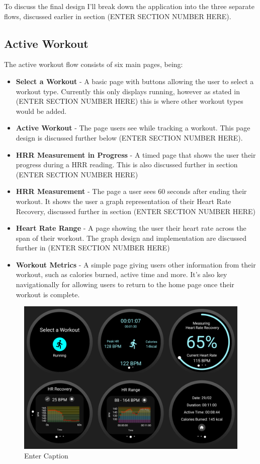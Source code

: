 \documentclass{l4proj}
\begin{document}
To discuss the final design I’ll break down the application into the three separate flows, discussed earlier in section (ENTER SECTION NUMBER HERE). 

\subsection{Active Workout}

The active workout flow consists of six main pages, being:

\begin{itemize}
    \item \textbf{Select a Workout} - A basic page with buttons allowing the user to select a workout type. Currently this only displays running, however as stated in (ENTER SECTION NUMBER HERE) this is where other workout types would be added.
    \item \textbf{Active Workout} - The page users see while tracking a workout. This page design is discussed further below (ENTER SECTION NUMBER HERE).
    \item \textbf{HRR Measurement in Progress} - A timed page that shows the user their progress during a HRR reading. This is also discussed further in section (ENTER SECTION NUMBER HERE)
    \item \textbf{HRR Measurement} - The page a user sees 60 seconds after ending their workout. It shows the user a graph representation of their Heart Rate Recovery, discussed further in section (ENTER SECTION NUMBER HERE)
    \item \textbf{Heart Rate Range} -  A page showing the user their heart rate across the span of their workout. The graph design and implementation are discussed further in (ENTER SECTION NUMBER HERE)
    \item \textbf{Workout Metrics} - A simple page giving users other information from their workout, such as calories burned, active time and more. It’s also key navigationally for allowing users to return to the home page once their workout is complete.
\end{itemize}

\begin{figure}[h!]
    \centering
    \includegraphics[width=1\linewidth]{dissertation//dissImages/ActiveWorkoutCombined.png}
    \caption{Enter Caption}
    \label{fig:enter-label}
\end{figure}
\end{document}
